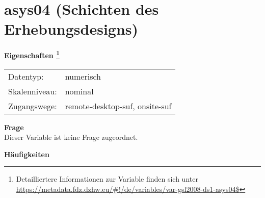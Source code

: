 
    \setcounter{footnote}{0}

    \vspace*{-1.8cm}
	\section{asys04 (Schichten des Erhebungsdesigns)}
	\label{section:asys04}



    \vspace*{0.5cm}
    \noindent\textbf{Eigenschaften
	\footnote{Detailliertere Informationen zur Variable finden sich unter
		\url{https://metadata.fdz.dzhw.eu/\#!/de/variables/var-gsl2008-ds1-asys04$}}}\\
	\begin{tabularx}{\hsize}{@{}lX}
	Datentyp: & numerisch \\
	Skalenniveau: & nominal \\
	Zugangswege: &
	  remote-desktop-suf, 
	  onsite-suf
 \\
    \end{tabularx}



		\vspace*{0.5cm}
		\noindent\textbf{Frage}\\
		Dieser Variable ist keine Frage zugeordnet.





        		\vspace*{0.5cm}
                \noindent\textbf{Häufigkeiten}

